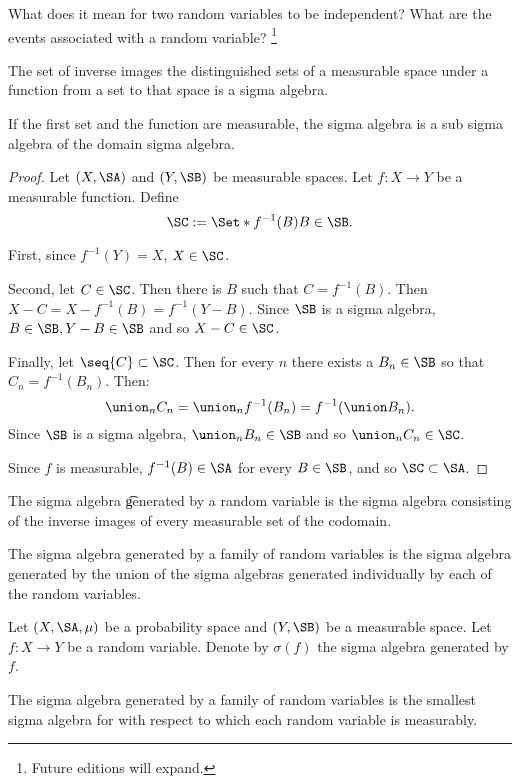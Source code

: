 

What does it mean for two random variables to be independent?
What are the events associated with a random variable?
  \ifhmode\unskip\fi\footnote{
Future editions will expand.
  }


\begin{proposition}

The set of inverse images the distinguished sets of a measurable space under a function from a set to that space is a sigma algebra.

If the first set and the function are measurable, the sigma algebra is a sub sigma algebra of the domain sigma algebra.

\begin{proof}

Let $(X, \SA)$ and $(Y, \SB)$ be measurable spaces.
Let $f: X \to Y$ be a measurable function. Define
  \[
\SC := \Set*{f^{-1}(B)}{B \in \SB}.
  \]

First, since $f^{-1}(Y) = X$, $X \in \SC$.

Second, let $C \in \SC$. Then there is $B$ such that $C = f^{-1}(B)$. Then $X - C = X - f^{-1}(B) = f^{-1}(Y - B)$.
Since $\SB$ is a sigma algebra, $B \in \SB, Y - B \in \SB$ and so $X - C \in \SC$.

Finally, let $\seq{C} \subset \SC$.
Then for every $n$ there exists a $B_n \in \SB$ so that $C_n = f^{-1}(B_n)$.
Then:
  \[
\union_{n} C_n = \union_n f^{-1}(B_n) = f^{-1}(\union B_n).
  \]
Since $\SB$ is a sigma algebra,
$\union_n B_n \in \SB$ and so $\union_{n} C_n \in \SC$.

Since $f$ is measurable, $f^{-1}(B) \in \SA$ for every $B \in \SB$, and so $\SC \subset \SA$.

\end{proof}

\end{proposition}

The sigma algebra \t{generated by a random variable} is the sigma algebra consisting of the inverse images of every measurable set of the codomain.

The sigma algebra generated by a family of random variables is the sigma algebra generated by the union of the sigma algebras generated individually by each of the random variables.


Let $(X, \SA, \mu )$ be a probability space and $(Y, \SB)$ be a measurable space.
Let $f: X \to Y$ be a random variable.
Denote by $\sigma (f)$ the sigma algebra generated by $f$.


\begin{proposition}
The sigma algebra generated by a family of random variables is the smallest sigma algebra for with respect to which each random variable is measurably.
\end{proposition}
